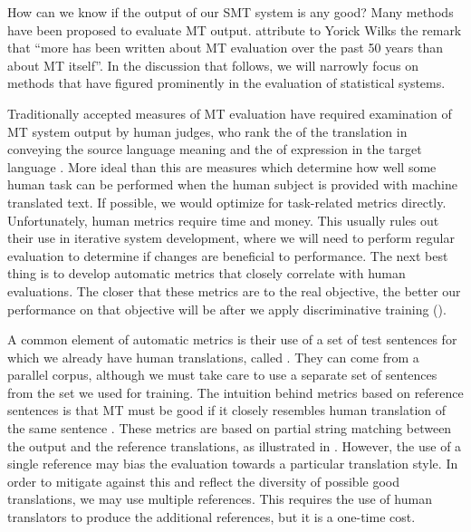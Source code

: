 How can we know if the output of our SMT system is any good?
Many methods have been proposed to evaluate MT output. 
\citet{Hovy:2002:mt} attribute to Yorick Wilks the remark that
``more has been written about MT evaluation over the past 50 
years than about MT itself''.
In the discussion that follows, we will narrowly focus on methods that
have figured prominently in the evaluation of statistical systems.

Traditionally accepted measures of MT evaluation have
required examination of MT system output by human
judges, who rank the  of the translation
in conveying the source language meaning and the 
 of expression in the target language \citep{White:1994:amta}.
More ideal than this are measures which
determine how well some human task can be performed when
the human subject is provided with machine 
translated text.  If possible, we would optimize for 
task-related metrics directly.  
Unfortunately, human metrics require time and money.  
This usually rules out their use in 
iterative system development, where
we will need to perform regular evaluation to 
determine if changes are beneficial to performance.
The next best thing is to develop automatic
metrics that closely correlate with human 
evaluations.  The closer that these metrics are 
to the real objective, the better our performance
on that objective will be after we apply 
discriminative training ().

A common element of automatic metrics is their use of a 
set of test sentences for which we already 
have human translations, called .
They can come from a parallel corpus, although we
must take care to use a separate set of sentences 
from the set we used for training.  The intuition
behind metrics based on reference sentences is
that MT must be good if it closely resembles human
translation of the same sentence \citep{Papineni:2002:acl}. 
These metrics are based on partial string 
matching between the output and
the reference translations, as illustrated
in .  However, the use
of a single reference may bias the evaluation towards
a particular translation style.  In order to mitigate
against this and reflect the diversity of possible 
good translations, we may use multiple references.  This requires the use
of human translators to produce the additional
references, but it is a one-time cost.

